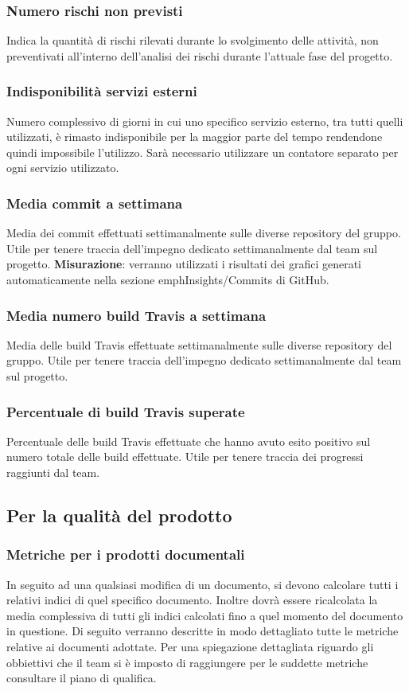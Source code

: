 \subsubsection{Numero rischi non previsti}\Spazio
Indica la quantità di rischi rilevati durante lo svolgimento delle attività, non preventivati all'interno dell'analisi dei rischi durante l'attuale fase del progetto.
\subsubsection{Indisponibilità servizi esterni}\Spazio
Numero complessivo di giorni in cui uno specifico servizio esterno, tra tutti quelli utilizzati, è rimasto indisponibile per la maggior parte del tempo rendendone quindi impossibile l'utilizzo. Sarà necessario utilizzare un contatore separato per ogni servizio utilizzato.
\subsubsection{Media commit a settimana}\Spazio
Media dei commit effettuati settimanalmente sulle diverse repository del gruppo. Utile per tenere traccia dell'impegno dedicato settimanalmente dal team sul progetto. \textbf{Misurazione}: verranno utilizzati i risultati dei grafici generati automaticamente nella sezione emph{Insights/Commits} di GitHub.
\subsubsection{Media numero build Travis a settimana}\Spazio
Media delle build Travis effettuate settimanalmente sulle diverse repository del gruppo. Utile per tenere traccia dell'impegno dedicato settimanalmente dal team sul progetto.
\subsubsection{Percentuale di build Travis superate}\Spazio
Percentuale delle build Travis effettuate che hanno avuto esito positivo sul numero totale delle build effettuate. Utile per tenere traccia dei progressi raggiunti dal team.


\subsection{Per la qualità del prodotto}
\subsubsection{Metriche per i prodotti documentali}\Spazio
In seguito ad una qualsiasi modifica di un documento, si devono calcolare tutti i relativi indici di quel specifico documento. Inoltre dovrà essere ricalcolata la media complessiva di tutti gli indici calcolati fino a quel momento del documento in questione.
Di seguito verranno descritte in modo dettagliato tutte le metriche relative ai documenti adottate. Per una spiegazione dettagliata riguardo gli obbiettivi che il team si è imposto di raggiungere per le suddette metriche consultare il piano di qualifica.

